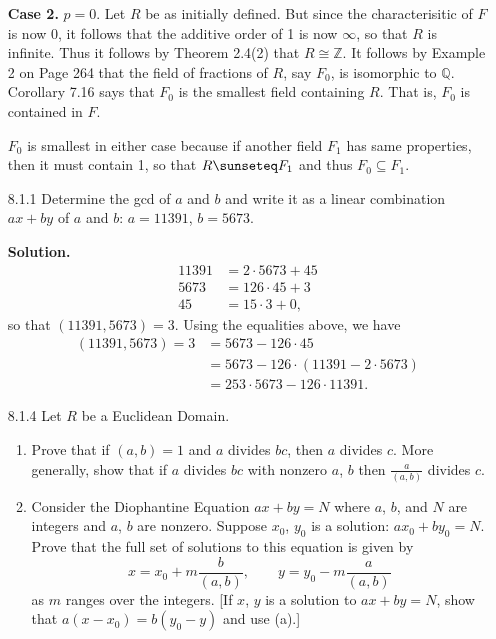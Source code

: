 \documentclass[9pt]{article}
\newcommand{\Z}{\mathbb{Z}}
\newcommand{\Q}{\mathbb{Q}}
\begin{document}
\begin{enumerate}
      \textbf{Case 2.} $p = 0$. Let $R$ be as initially defined. But since
      the characterisitic of $F$ is now 0, it follows that the additive order of
      1 is now $\infty$, so that $R$ is infinite. Thus it follows by Theorem
      2.4(2) that $R \cong \Z$. It follows by Example 2 on Page 264 that
      the field of fractions of $R$, say $F_0$, is isomorphic to $\Q$.
      Corollary 7.16 says that $F_0$ is the smallest field containing $R$. That
      is, $F_0$ is contained in $F$.
      
      $F_0$ is smallest in either case because if another field $F_1$ has same
      properties, then it must contain 1, so that $R \sunseteq F_1$ and thus
      $F_0 \subseteq F_1$.
   \item[8.1.1]   Determine the gcd of $a$ and $b$ and write it as a linear
                  combination $ax + by$ of $a$ and $b$: $a = 11391$, $b = 5673$.
                  
      \textbf{Solution.}
      \begin{align*}
         11391 &= 2 \cdot 5673 + 45 \\
         5673 &= 126 \cdot 45 + 3 \\
         45 &= 15 \cdot 3 + 0,
      \end{align*}
      so that $(11391, 5673) = 3$. Using the equalities above, we have
      \begin{align*}
         (11391, 5673) = 3 &= 5673 - 126 \cdot 45 \\
           &= 5673 - 126 \cdot (11391 - 2 \cdot 5673) \\
           &= 253 \cdot 5673 - 126 \cdot 11391.
      \end{align*}
   \item[8.1.4]   Let $R$ be a Euclidean Domain.
                  \begin{enumerate}
                     \item Prove that if $(a, b) = 1$ and $a$ divides $bc$, then
                           $a$ divides $c$. More generally, show that if $a$
                           divides $bc$ with nonzero $a$, $b$ then
                           $\frac{a}{(a, b)}$ divides $c$.
                     \item Consider the Diophantine Equation $ax + by = N$ where
                           $a$, $b$, and $N$ are integers and $a$, $b$ are
                           nonzero. Suppose $x_0$, $y_0$ is a solution:
                           $ax_0 + by_0 = N$. Prove that the full set of
                           solutions to this equation is given by
                           $$x = x_0 + m\frac{b}{(a, b)}, \qquad
                             y = y_0 - m\frac{a}{(a, b)}$$
                           as $m$ ranges over the integers. [If $x$, $y$ is a
                           solution to $ax + by = N$, show that
                           $a(x - x_0) = b(y_0 - y)$ and use (a).]
                  \end{enumerate}


\end{enumerate}
\end{document}

